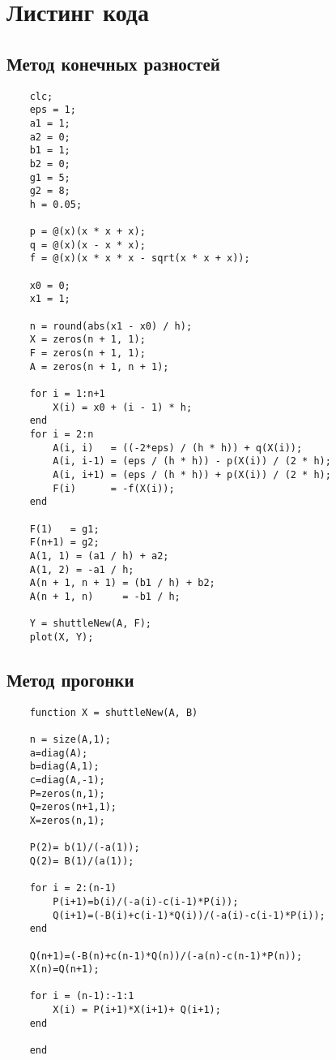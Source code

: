 \documentclass[a4paper,12pt]{extarticle}
\begin{document}
    \section{Листинг кода}
    \subsection{Метод конечных разностей}
    \begin{lstlisting}
    clc;
    eps = 1;
    a1 = 1;
    a2 = 0;
    b1 = 1;
    b2 = 0;
    g1 = 5;
    g2 = 8;
    h = 0.05;
    
    p = @(x)(x * x + x);
    q = @(x)(x - x * x);
    f = @(x)(x * x * x - sqrt(x * x + x));
    
    x0 = 0;
    x1 = 1;
    
    n = round(abs(x1 - x0) / h);
    X = zeros(n + 1, 1);
    F = zeros(n + 1, 1);
    A = zeros(n + 1, n + 1);
    
    for i = 1:n+1
        X(i) = x0 + (i - 1) * h;
    end
    for i = 2:n
        A(i, i)   = ((-2*eps) / (h * h)) + q(X(i));
        A(i, i-1) = (eps / (h * h)) - p(X(i)) / (2 * h);
        A(i, i+1) = (eps / (h * h)) + p(X(i)) / (2 * h);
        F(i)      = -f(X(i));
    end
    
    F(1)   = g1;
    F(n+1) = g2;
    A(1, 1) = (a1 / h) + a2;
    A(1, 2) = -a1 / h;
    A(n + 1, n + 1) = (b1 / h) + b2;
    A(n + 1, n)     = -b1 / h;
    
    Y = shuttleNew(A, F);
    plot(X, Y);
    \end{lstlisting}
    
    \subsection{Метод прогонки}
    \begin{lstlisting}
    function X = shuttleNew(A, B)

    n = size(A,1);
    a=diag(A);
    b=diag(A,1);
    c=diag(A,-1);
    P=zeros(n,1);
    Q=zeros(n+1,1);
    X=zeros(n,1);
    
    P(2)= b(1)/(-a(1));
    Q(2)= B(1)/(a(1));
    
    for i = 2:(n-1)
        P(i+1)=b(i)/(-a(i)-c(i-1)*P(i));
        Q(i+1)=(-B(i)+c(i-1)*Q(i))/(-a(i)-c(i-1)*P(i));
    end
    
    Q(n+1)=(-B(n)+c(n-1)*Q(n))/(-a(n)-c(n-1)*P(n));
    X(n)=Q(n+1);
    
    for i = (n-1):-1:1
        X(i) = P(i+1)*X(i+1)+ Q(i+1);
    end
    
    end
    \end{lstlisting}
    
\end{document}
